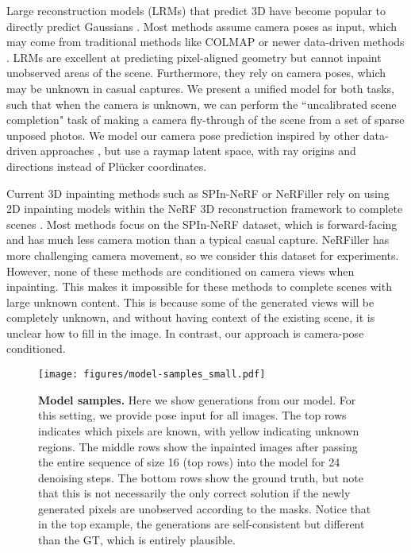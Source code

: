 Large reconstruction models (LRMs) that predict 3D have become popular to directly predict Gaussians \cite{xu2024grm,ZiwenTZBLHFX2024}.
Most methods assume camera poses as input, which may come from traditional methods like COLMAP \cite{schonberger2016structure} or newer data-driven methods \cite{wang2024dust3r,leroy2024grounding}.
LRMs are excellent at predicting pixel-aligned geometry but cannot inpaint unobserved areas of the scene.
Furthermore, they rely on camera poses, which may be unknown in casual captures.
We present a unified model for both tasks, such that when the camera is unknown, we can perform the ``uncalibrated scene completion" task of making a camera fly-through of the scene from a set of sparse unposed photos.
We model our camera pose prediction inspired by other data-driven approaches \cite{zhang2024cameras}, but use a raymap latent space, with ray origins and directions instead of Plücker coordinates.

Current 3D inpainting methods such as SPIn-NeRF \cite{mirzaei2023spin} or NeRFiller \cite{weber2024nerfiller} rely on using 2D inpainting models within the NeRF 3D reconstruction framework to complete scenes \cite{ShihMHCCK2024}.
Most methods \cite{CaoYFWX2024,ChenCSXZ2024,LinKHLMKYT2024,ChenLP2024} focus on the SPIn-NeRF dataset, which is forward-facing and has much less camera motion than a typical casual capture.
NeRFiller has more challenging camera movement, so we consider this dataset for experiments.
However, none of these methods are conditioned on camera views when inpainting.
This makes it impossible for these methods to complete scenes with large unknown content.
This is because some of the generated views will be completely unknown, and without having context of the existing scene, it is unclear how to fill in the image.
In contrast, our approach is camera-pose conditioned.

\begin{figure*}[t]
\centering
\texttt{[image: figures/model-samples\_small.pdf]}
\vspace{-15px}
\caption{\label{fig:model_samples}%
    \textbf{Model samples.}
    Here we show generations from our model.
    For this setting, we provide pose input for all images.
    The top rows indicates which pixels are known, with yellow indicating unknown regions.
    The middle rows show the inpainted images after passing the entire sequence of size 16 (top rows) into the model for 24 denoising steps.
    The bottom rows show the ground truth, but note that this is not necessarily the only correct solution if the newly generated pixels are unobserved according to the masks.
    Notice that in the top example, the generations are self-consistent but different than the GT, which is entirely plausible.
    \vspace{-1em}
}
\end{figure*}

